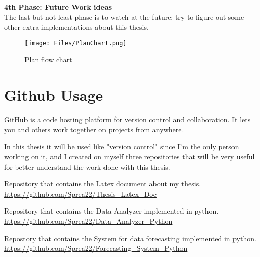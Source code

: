 \textbf{4th Phase: Future Work ideas}\\
The last but not least phase is to watch at the future: try to figure out some other extra implementations about this thesis.

\newpage
\begin{figure}[h]
    \centering
    \texttt{[image: Files/PlanChart.png]}
    \caption[Plan flow chart]{Plan flow chart}
    \label{fig: Plan_Flow_Chart}
\end{figure}

\newpage 
\section{Github Usage}
GitHub is a code hosting platform for version control and collaboration. It lets you and others work together on projects from anywhere.

In this thesis it will be used like "version control" since I'm the only person working on it, and I created on myself three repositories that will be very useful for better understand the work done with this thesis.

Repository that contains the Latex document about my thesis.\\
\url{https://github.com/Sprea22/Thesis_Latex_Doc}

Repository that contains the Data Analyzer implemented in python.\\
\url{https://github.com/Sprea22/Data_Analyzer_Python}

Repostory that contains the System for data forecasting implemented in python.\\
\url{https://github.com/Sprea22/Forecasting_System_Python}
